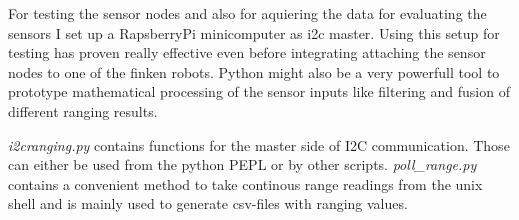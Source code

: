 For testing the sensor nodes and also for aquiering the data for evaluating the sensors I set up a RapsberryPi minicomputer as i2c master.
Using this setup for testing has proven really effective even before integrating attaching the sensor nodes to one of the finken robots.
Python might also be a very powerfull tool to prototype mathematical processing of the sensor inputs like filtering and fusion of different ranging results.

\emph{i2cranging.py} contains functions for the master side of I2C communication. Those can either be used from the python PEPL or by other scripts.
\emph{poll\_range.py} contains a convenient method to take continous range readings from the unix shell and is mainly used to generate csv-files with ranging values.
